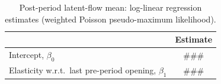 \begin{table}[t]
  \centering
  \caption{Post-period latent-flow mean: log-linear regression estimates (weighted Poisson pseudo-maximum likelihood).}
  \label{tab:model_latent_negative_binomial}
\begin{tabular}{lc}
\toprule
 & Estimate \\
\midrule
Intercept, $\beta_0$                                  & ### \\
Elasticity w.r.t.\ last pre-period opening, $\beta_1$ & ### \\
\bottomrule
\end{tabular}
\end{table}
